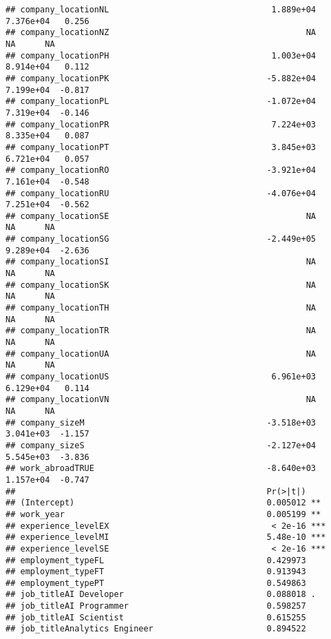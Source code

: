 \documentclass[
]{article}
\begin{document}
\begin{verbatim}
## company_locationNL                                 1.889e+04  7.376e+04   0.256
## company_locationNZ                                        NA         NA      NA
## company_locationPH                                 1.003e+04  8.914e+04   0.112
## company_locationPK                                -5.882e+04  7.199e+04  -0.817
## company_locationPL                                -1.072e+04  7.319e+04  -0.146
## company_locationPR                                 7.224e+03  8.335e+04   0.087
## company_locationPT                                 3.845e+03  6.721e+04   0.057
## company_locationRO                                -3.921e+04  7.161e+04  -0.548
## company_locationRU                                -4.076e+04  7.251e+04  -0.562
## company_locationSE                                        NA         NA      NA
## company_locationSG                                -2.449e+05  9.289e+04  -2.636
## company_locationSI                                        NA         NA      NA
## company_locationSK                                        NA         NA      NA
## company_locationTH                                        NA         NA      NA
## company_locationTR                                        NA         NA      NA
## company_locationUA                                        NA         NA      NA
## company_locationUS                                 6.961e+03  6.129e+04   0.114
## company_locationVN                                        NA         NA      NA
## company_sizeM                                     -3.518e+03  3.041e+03  -1.157
## company_sizeS                                     -2.127e+04  5.545e+03  -3.836
## work_abroadTRUE                                   -8.640e+03  1.157e+04  -0.747
##                                                   Pr(>|t|)    
## (Intercept)                                       0.005012 ** 
## work_year                                         0.005199 ** 
## experience_levelEX                                 < 2e-16 ***
## experience_levelMI                                5.48e-10 ***
## experience_levelSE                                 < 2e-16 ***
## employment_typeFL                                 0.429973    
## employment_typeFT                                 0.913943    
## employment_typePT                                 0.549863    
## job_titleAI Developer                             0.088018 .  
## job_titleAI Programmer                            0.598257    
## job_titleAI Scientist                             0.615255    
## job_titleAnalytics Engineer                       0.894522    

\end{verbatim}
\end{document}
